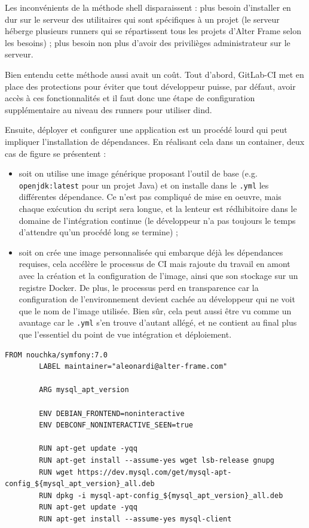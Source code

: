 Les inconvénients de la méthode shell disparaissent : plus besoin d'installer en dur sur le serveur des utilitaires qui sont spécifiques à un projet (le serveur héberge plusieurs runners qui se répartissent tous les projets d'Alter Frame selon les besoins) ; plus besoin non plus d'avoir des privilièges administrateur sur le serveur.

Bien entendu cette méthode aussi avait un coût. Tout d'abord, GitLab-CI met en place des protections pour éviter que tout développeur puisse, par défaut, avoir accès à ces fonctionnalités et il faut donc une étape de configuration supplémentaire au niveau des runners pour utiliser dind.

Ensuite, déployer et configurer une application est un procédé lourd qui peut impliquer l'installation de dépendances. En réalisant cela dans un container, deux cas de figure se présentent :
\begin{itemize}
	\item soit on utilise une image générique proposant l'outil de base (e.g. \verb|openjdk:latest| pour un projet Java) et on installe dans le \verb|.yml| les différentes dépendance. Ce n'est pas compliqué de mise en oeuvre, mais chaque exécution du script sera longue, et la lenteur est rédhibitoire dans le domaine de l'intégration continue (le développeur n'a pas toujours le temps d'attendre qu'un procédé long se termine) ;
	\item soit on crée une image personnalisée qui embarque déjà les dépendances requises, cela accélère le processus de CI mais rajoute du travail en amont avec la création et la configuration de l'image, ainsi que son stockage sur un registre Docker. De plus, le processus perd en transparence car la configuration de l'environnement devient cachée au développeur qui ne voit que le nom de l'image utilisée. Bien sûr, cela peut aussi être vu comme un avantage car le \verb|.yml| s'en trouve d'autant allégé, et ne contient au final plus que l'essentiel du point de vue intégration et déploiement.
\end{itemize}
\begin{minipage}{\linewidth}
	\begin{lstlisting}[caption={Dockerfile utilisé pour le job de déploiement de l'application},label={lst:dockerfile}]
		FROM nouchka/symfony:7.0
		LABEL maintainer="aleonardi@alter-frame.com"
		
		ARG mysql_apt_version
		
		ENV DEBIAN_FRONTEND=noninteractive
		ENV DEBCONF_NONINTERACTIVE_SEEN=true
		
		RUN apt-get update -yqq
		RUN apt-get install --assume-yes wget lsb-release gnupg
		RUN wget https://dev.mysql.com/get/mysql-apt-config_${mysql_apt_version}_all.deb
		RUN dpkg -i mysql-apt-config_${mysql_apt_version}_all.deb
		RUN apt-get update -yqq
		RUN apt-get install --assume-yes mysql-client		
	\end{lstlisting}
\end{minipage}

